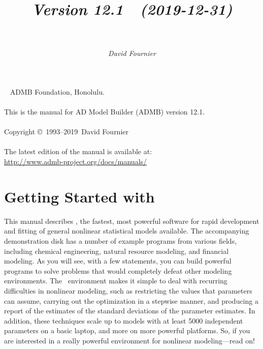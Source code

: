 \documentclass{admbmanual}
\newcommand\admbversion{12.1}
\newcommand\admbyear{2019}
\newcommand\admbdate{2019-12-31}
\begin{document}
\title{%
  \vspace{3ex}\textsf{\textit{Version \admbversion~~(\admbdate)\\[3pt]
      ~%
    }}\vspace{3ex}
}
\author{\textsf{\textit{David Fournier}}}
\maketitle

~\vfill
\noindent ADMB Foundation, Honolulu.\\\\
\noindent This is the manual for AD Model Builder (ADMB) version
\admbversion.\\\\
\noindent Copyright \copyright\ 1993--\admbyear\ David Fournier\\\\
\noindent The latest edition of the manual is available at:\\
\url{http://www.admb-project.org/docs/manuals/}

\tableofcontents

\chapter{Getting Started with \ADM}

This manual describes \ADM, the fastest, most powerful software for rapid
development and fitting of general nonlinear statistical models available. The
accompanying demonstration disk has a number of example programs from various
fields, including chemical engineering, natural resource modeling, and financial
modeling. As you will see, with a few statements, you can build powerful
programs to solve problems that would completely defeat other modeling
environments. The \ADM\ environment makes it simple to deal with recurring
difficulties in nonlinear modeling, such as restricting the values that
parameters can assume, carrying out the optimization in a stepwise manner, and
producing a report of the estimates of the standard deviations of the parameter
estimates. In addition, these techniques scale up to models with at least 5000
independent parameters on a basic laptop, and more on more powerful
platforms. So, if you are interested in a really powerful environment for
nonlinear modeling---read on!
\end{document}
